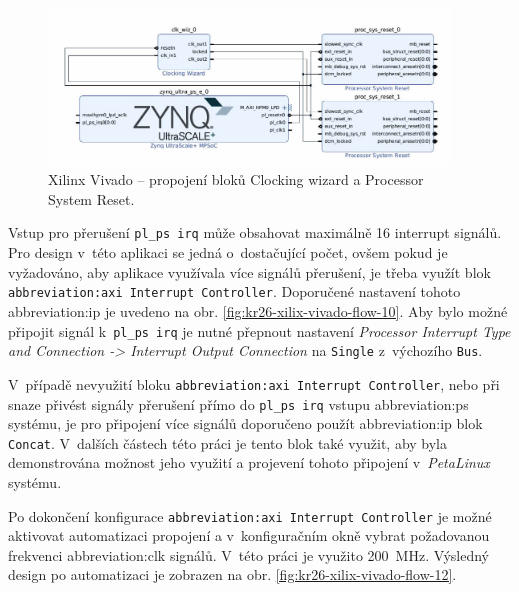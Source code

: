\documentclass[a4paper, twoside, 11pt]{article}
\begin{document}
				\begin{figure}[htbp!]
					\centering
					\includegraphics[width=0.95\textwidth]{src/png/kr26-xilinx-vivado-flow/kr26-xilix-vivado-flow-09.jpg}
					\caption{Xilinx Vivado – propojení bloků Clocking wizard a Processor System Reset.}
					\label{fig:kr26-xilix-vivado-flow-09}
				\end{figure}
				
				Vstup pro přerušení \texttt{pl\_ps irq} může obsahovat maximálně 16 interrupt signálů. Pro design v~této aplikaci se jedná o~dostačující počet, ovšem pokud je vyžadováno, aby aplikace využívala více signálů přerušení, je třeba využít blok \texttt{\gls{abbreviation:axi} Interrupt Controller}. Doporučené nastavení tohoto \gls{abbreviation:ip} je uvedeno na obr. \ref{fig:kr26-xilix-vivado-flow-10}. Aby bylo možné připojit signál k~\texttt{pl\_ps irq} je nutné přepnout nastavení \textit{Processor Interrupt Type and Connection -> Interrupt Output Connection} na \texttt{Single} z~výchozího \texttt{Bus}.\par
				V~případě nevyužití bloku \texttt{\gls{abbreviation:axi} Interrupt Controller}, nebo při snaze přivést signály přerušení přímo do \texttt{pl\_ps irq} vstupu \gls{abbreviation:ps} systému, je pro připojení více signálů doporučeno použít \gls{abbreviation:ip} blok \texttt{Concat}. V~dalších částech této práci je tento blok také využit, aby byla demonstrována možnost jeho využití a projevení tohoto připojení v~\textit{PetaLinux} systému.\par
				Po dokončení konfigurace \texttt{\gls{abbreviation:axi} Interrupt Controller} je možné aktivovat automatizaci propojení a v~konfiguračním okně vybrat požadovanou frekvenci \gls{abbreviation:clk} signálů. V~této práci je využito 200~MHz. Výsledný design po automatizaci je zobrazen na obr. \ref{fig:kr26-xilix-vivado-flow-12}.\par
\end{document}
